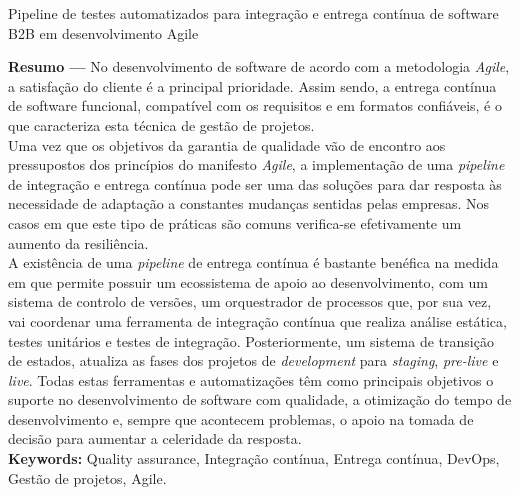 


\begin{center}
\large{Pipeline de testes automatizados para integração e entrega contínua de software B2B em desenvolvimento Agile}


\vskip5mm 
 
\end{center}

\textbf{Resumo ---} 
No desenvolvimento de software de acordo com a metodologia \textit{Agile}, a satisfação do cliente é a principal prioridade. Assim sendo, a entrega contínua de software funcional, compatível com os requisitos e em formatos confiáveis, é o que caracteriza esta técnica de gestão de projetos.\\ 

\hspace{1cm}Uma vez que os objetivos da garantia de qualidade vão de encontro aos pressupostos dos princípios do manifesto \textit{Agile}, a implementação de uma \textit{pipeline} de integração e entrega contínua pode ser uma das soluções para dar resposta às necessidade de adaptação a constantes mudanças sentidas pelas empresas. Nos casos em que este tipo de práticas são comuns verifica-se efetivamente um aumento da resiliência.\\ 

\hspace{1cm}A existência de uma \textit{pipeline} de entrega contínua é bastante benéfica na medida em que permite possuir um ecossistema de apoio ao desenvolvimento, com um sistema de controlo de versões, um orquestrador de processos que, por sua vez, vai coordenar uma ferramenta de integração contínua que realiza análise estática, testes unitários e testes de integração. Posteriormente, um sistema de transição de estados, atualiza as fases dos projetos de \textit{development} para \textit{staging}, \textit{pre-live} e \textit{live}. Todas estas ferramentas e automatizações têm como principais objetivos o suporte no desenvolvimento de software com qualidade, a otimização do tempo de desenvolvimento e, sempre que acontecem problemas, o apoio na tomada de decisão para aumentar a celeridade da resposta.\\

\textbf{Keywords:} Quality assurance, Integração contínua, Entrega contínua, DevOps, Gestão de projetos, Agile.

